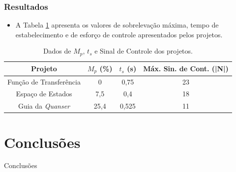 \documentclass{beamer}
\begin{document}
\begin{frame}
\frametitle{Resultados}
\begin{itemize}
\item A Tabela \ref{conclusoes} apresenta os valores de sobrelevação máxima, tempo de estabelecimento e de esforço de controle apresentados pelos projetos.
\end{itemize}
\begin{table}[H]{\centering}
\centering
	\renewcommand{\tablename}{Tabela 2}
    \caption{Dados de $M_p$, $t_s$ e Sinal de Controle dos projetos.}
	\begin{tabular}{|c|c|c|c|} \hline
  Projeto & $M_p$ (\%) & $t_s$ (s) & Máx. Sin. de Cont. (|N|) \\ \hline
	Função de Transferência & 0 & 0,75 & 23 \\ \hline
  	Espaço de Estados & 7,5 & 0,4 & 18 \\ \hline
  	Guia da \textit{Quanser} & 25,4 & 0,525 & 11 \\ \hline
   \end{tabular}
	\label{conclusoes}
\end{table}
\end{frame}

\section{Conclusões}
\begin{frame}
\Huge{\centerline{Conclusões}}
\end{frame}
\end{document}
